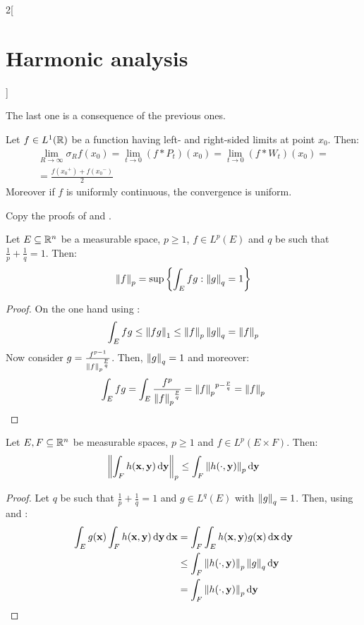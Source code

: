 \documentclass[../../../main_math.tex]{subfiles}
\begin{document}
\begin{multicols}{2}[\section{Harmonic analysis}]
\begin{sproof}
    The last one is a consequence of the previous ones.
  \end{sproof}
  \begin{theorem}
    Let $f\in L^1(\mathbb{R})$ be a function having left- and right-sided limits at point $x_0$. Then:
    \begin{multline*}
      \lim_{R\to\infty}\sigma_Rf(x_0)=\lim_{t\to 0}(f*P_t)(x_0)=\lim_{t\to 0}(f*W_t)(x_0)=\\=\frac{f({x_0}^+)+f({x_0}^-)}{2}
    \end{multline*}
    Moreover if $f$ is uniformly continuous, the convergence is uniform.
  \end{theorem}
  \begin{sproof}
    Copy the proofs of  and .
  \end{sproof}
  \begin{lemma}\label{HA:normLpEquiv}
    Let $E\subseteq\mathbb{R}^n$ be a measurable space, $p\geq 1$, $f\in L^p(E)$ and $q$ be such that $\frac{1}{p}+\frac{1}{q}=1$. Then:
    $$\left\|f\right\|_p=\sup\left\{\int_Efg:\left\|g\right\|_q=1\right\}$$
  \end{lemma}
  \begin{proof}
    On the one hand using : $$\int_Efg\leq\left\|fg\right\|_1\leq\left\|f\right\|_p\left\|g\right\|_q=\left\|f\right\|_p$$
    Now consider $g=\frac{f^{p-1}}{{\left\|f\right\|_p}^{\frac{p}{q}}}$. Then, $\left\|g\right\|_q=1$ and moreover: $$\int_Efg=\int_E\frac{f^p}{{\left\|f\right\|_p}^{\frac{p}{q}}}={\left\|f\right\|_p}^{p-\frac{p}{q}}=\left\|f\right\|_p$$
  \end{proof}
  \begin{lemma}\label{HA:minkowski}
    Let $E,F\subseteq\mathbb{R}^n$ be measurable spaces, $p\geq 1$ and $f\in L^p(E\times F)$. Then:
    $$\left\|\int_F h(\boldsymbol{\mathrm{x}},\boldsymbol{\mathrm{y}})\dd{\boldsymbol{\mathrm{y}}}\right\|_p\leq\int_F\left\|h(\cdot,\boldsymbol{\mathrm{y}})\right\|_p\dd{\boldsymbol{\mathrm{y}}}$$
  \end{lemma}
  \begin{proof}
    Let $q$ be such that $\frac{1}{p}+\frac{1}{q}=1$ and $g\in L^q(E)$ with $\left\|g\right\|_q=1$. Then, using  and :
    \begin{align*}
      \int_Eg(\vf{x})\int_F h(\vf{x},\vf{y})\dd{\vf{y}}\dd{\vf{x}} & =\int_F\int_E h(\vf{x},\vf{y})g(\vf{x})\dd{\vf{x}}\dd{\vf{y}} \\
                                                                   & \leq \int_F\norm{h(\cdot,\vf{y})}_p\norm{g}_q\dd{\vf{y}}      \\
                                                                   & =\int_F\norm{h(\cdot,\vf{y})}_p\dd{\vf{y}}

\end{align*}
\end{proof}
\end{multicols}
\end{document}
